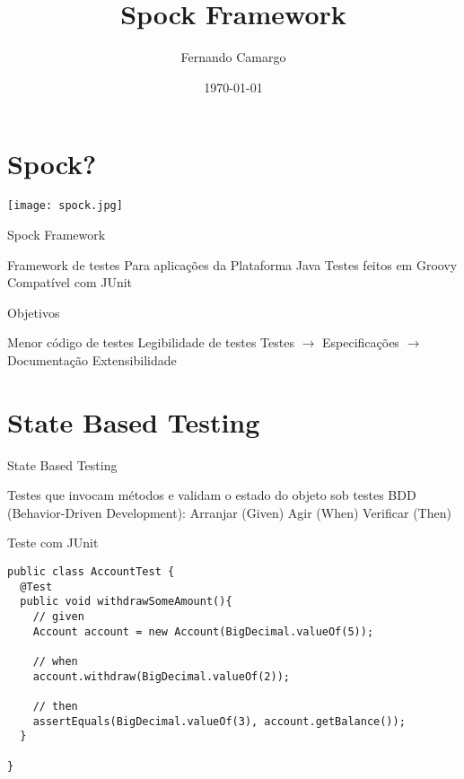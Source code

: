 \documentclass{beamer}
\title{Spock Framework}
\date{\today}
\author{Fernando Camargo}
\institute{ZG Soluções}
\begin{document}
\maketitle

\section{Spock?}

\begin{frame}
  \begin{center}
    \texttt{[image: spock.jpg]}
  \end{center}
\end{frame}

\begin{frame}{Spock Framework}
 \begin{outline}
    Framework de testes
    Para aplicações da Plataforma Java
    Testes feitos em Groovy
    Compatível com JUnit
 \end{outline}
\end{frame}

\begin{frame}{Objetivos}
 \begin{outline}
    Menor código de testes
    Legibilidade de testes
    Testes $\rightarrow$ Especificações $\rightarrow$ Documentação
    Extensibilidade
 \end{outline}
\end{frame}

\section{State Based Testing}

\begin{frame}{State Based Testing}
 \begin{outline}
    Testes que invocam métodos e validam o estado do objeto sob testes
    BDD (Behavior-Driven Development):
     Arranjar (Given)
     Agir (When)
     Verificar (Then)
 \end{outline}
\end{frame}

\begin{frame}[fragile]{Teste com JUnit}
 \begin{verbatim}
public class AccountTest {
  @Test
  public void withdrawSomeAmount(){
    // given
    Account account = new Account(BigDecimal.valueOf(5));
    
    // when
    account.withdraw(BigDecimal.valueOf(2));
    
    // then
    assertEquals(BigDecimal.valueOf(3), account.getBalance());
  }
  
}
  \end{verbatim}
\end{frame}
\end{document}
